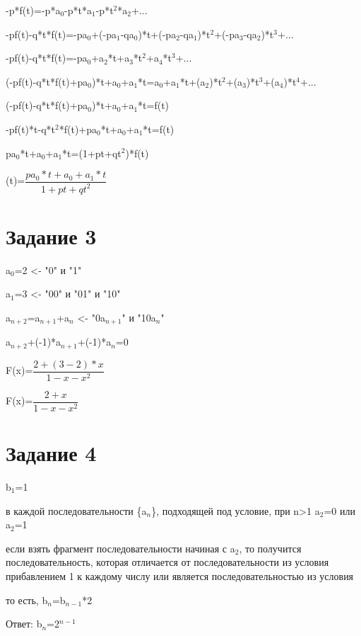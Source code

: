\documentclass[a4paper, 12pt]{article}
\newcommand{\ans}{Ответ: }
\begin{document}
		-p*f(t)=-p*a$_0$-p*t*a$_1$-p*t$^2$*a$_2$+...

		-pf(t)-q*t*f(t)=-pa$_0$+(-pa$_1$-qa$_0$)*t+(-pa$_2$-qa$_1$)*t$^2$+(-pa$_3$-qa$_2$)*t$^3$+...

		-pf(t)-q*t*f(t)=-pa$_0$+a$_2$*t+a$_3$*t$^2$+a$_4$*t$^3$+...

		(-pf(t)-q*t*f(t)+pa$_0$)*t+a$_0$+a$_1$*t=a$_0$+a$_1$*t+(a$_2$)*t$^2$+(a$_3$)*t$^3$+(a$_4$)*t$^4$+...

		(-pf(t)-q*t*f(t)+pa$_0$)*t+a$_0$+a$_1$*t=f(t)

		-pf(t)*t-q*t$^2$*f(t)+pa$_0$*t+a$_0$+a$_1$*t=f(t)

		pa$_0$*t+a$_0$+a$_1$*t=(1+pt+qt$^2$)*f(t)

		(t)=$\dfrac{pa_0*t+a_0+a_1*t}{1+pt+qt^2}$
	\section*{Задание 3}
		a$_0$=2 <- "0" и "1"

		a$_1$=3 <- "00" и "01" и "10"

		a$_{n+2}$=a$_{n+1}$+a$_{n}$ <- "0a$_{n+1}$" и "10a$_{n}$"

		a$_{n+2}$+(-1)*a$_{n+1}$+(-1)*a$_n$=0

		F(x)=$\dfrac{2+(3-2)*x}{1-x-x^2}$

		F(x)=$\dfrac{2+x}{1-x-x^2}$
	\section*{Задание 4}
		b$_1$=1

		в каждой последовательности \{a$_n$\}, подходящей под условие, при n>1 a$_2$=0 или a$_2$=1

		если взять фрагмент последовательности начиная с a$_2$, то получится последовательность, которая отличается от последовательности из условия прибавлением 1 к каждому числу или является последовательностью из условия

		то есть, b$_n$=b$_{n-1}$*2

		\ans b$_n$=2$^{n-1}$
\end{document}
